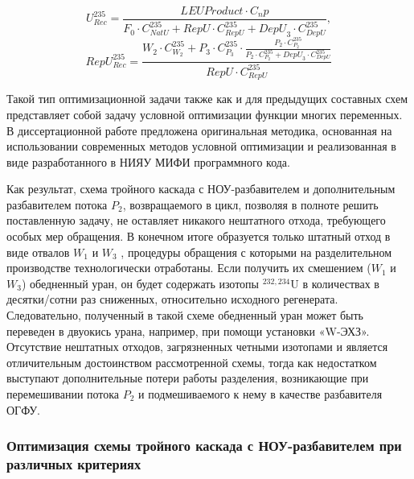 \begin{equation} \label{Rec3} 
    U^{235}_{Rec} = \frac{LEU Product \cdot C_np}{F_0 \cdot C_{NatU}^{235} + RepU \cdot C_{RepU}^{235} + {DepU}_3 \cdot C_{DepU}^{235}}, 
\end{equation} 
\begin{equation} \label{RecR3} 
    RepU^{235}_{Rec} = \frac{W_2\cdot C_{W_2}^{235}+P_3\cdot C_{P_3}^{235}\cdot \frac{P_2\cdot C_{P_2}^{235}}{P_2\cdot C_{P_2}^{235}+ {DepU}_3 \cdot C_{DepU}^{235}}}{RepU \cdot C_{RepU}^{235}}        
\end{equation} 

Такой тип оптимизационной задачи также как и для предыдущих составных схем представляет собой задачу условной оптимизации функции многих переменных. В диссертационной работе предложена оригинальная методика, основанная на использовании современных методов условной оптимизации и реализованная в виде разработанного в НИЯУ МИФИ программного кода.



Как результат, схема тройного каскада с НОУ-разбавителем и дополнительным разбавителем потока $P_2$, возвращаемого в цикл, позволяя в полноте решить поставленную задачу, не оставляет никакого нештатного отхода, требующего особых мер обращения. В конечном итоге образуется только штатный отход в виде отвалов $W_1$ и $W_3$ , процедуры обращения с которыми на разделительном производстве технологически отработаны. Если получить их смешением ($W_1$ и $W_3$) обедненный уран, он будет содержать изотопы $^{232,234}$U в количествах в десятки/сотни раз сниженных, относительно исходного регенерата. Следовательно, полученный в такой схеме обедненный уран может быть переведен в двуокись урана, например, при помощи установки «W-ЭХЗ». Отсутствие нештатных отходов, загрязненных четными изотопами и является отличительным достоинством рассмотренной схемы, тогда как недостатком выступают дополнительные потери работы разделения, возникающие при перемешивании потока $P_2$ и подмешиваемого к нему в качестве разбавителя ОГФУ.

\subsubsection{Оптимизация схемы тройного каскада с НОУ-разбавителем при различных критериях}

